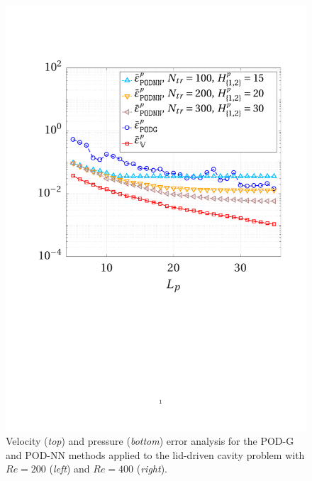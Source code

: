 \documentclass[longtitle]{elsarticle}
\numberwithin{equation}{section}
\theoremstyle{theorem}
\theoremstyle{definition}
\theoremstyle{remark}
\theoremstyle{proposition}
\numberwithin{figure}{section}
\begin{document}
\begin{figure}[t!]
			\includegraphics[scale = 0.37, trim = {2cm 9cm 1.5cm 3.5cm}, clip]{dc_400_p_error_vs_rank}
			
			\vspace*{-0.3cm}

			\caption{Velocity (\emph{top}) and pressure (\emph{bottom}) error analysis for the POD-G and POD-NN methods applied to the lid-driven cavity problem with $Re = 200$ (\emph{left}) and $Re = 400$ (\emph{right}).}
			\label{fig:dc-error-vs-rank}
		\end{figure}
\end{document}
